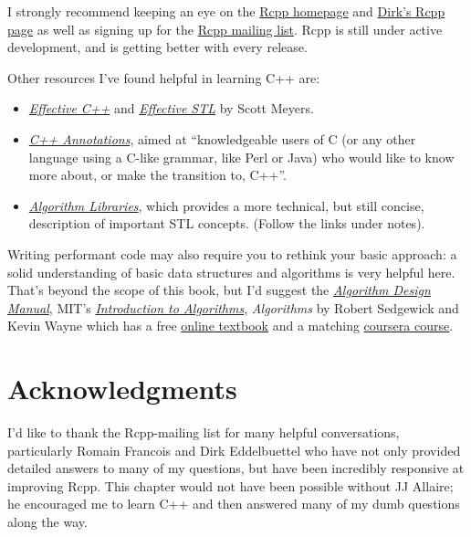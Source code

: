 I strongly recommend keeping an eye on the
\href{http://www.rcpp.org}{Rcpp homepage} and
\href{http://dirk.eddelbuettel.com/code/rcpp.html}{Dirk's Rcpp page} as
well as signing up for the
\href{http://lists.r-forge.r-project.org/cgi-bin/mailman/listinfo/rcpp-devel}{Rcpp
mailing list}. Rcpp is still under active development, and is getting
better with every release.

Other resources I've found helpful in learning C++ are:

\begin{itemize}
\item
  \href{http://amzn.com/0321334876?tag=devtools-20}{\emph{Effective
  C++}} and
  \href{http://amzn.com/0201749629?tag=devtools-20}{\emph{Effective
  STL}} by Scott Meyers.
\item
  \href{http://www.icce.rug.nl/documents/cplusplus/cplusplus.html}{\emph{C++
  Annotations}}, aimed at ``knowledgeable users of C (or any other
  language using a C-like grammar, like Perl or Java) who would like to
  know more about, or make the transition to, C++''.
\item
  \href{http://www.cs.helsinki.fi/u/tpkarkka/alglib/k06/}{\emph{Algorithm
  Libraries}}, which provides a more technical, but still concise,
  description of important STL concepts. (Follow the links under notes).
\end{itemize}

Writing performant code may also require you to rethink your basic
approach: a solid understanding of basic data structures and algorithms
is very helpful here. That's beyond the scope of this book, but I'd
suggest the
\href{http://amzn.com/0387948600?tag=devtools-20}{\emph{Algorithm Design
Manual}}, MIT's
\href{http://ocw.mit.edu/courses/electrical-engineering-and-computer-science/6-046j-introduction-to-algorithms-sma-5503-fall-2005/}{\emph{Introduction
to Algorithms}}, \emph{Algorithms} by Robert Sedgewick and Kevin Wayne
which has a free \href{http://algs4.cs.princeton.edu/home/}{online
textbook} and a matching
\href{https://www.coursera.org/course/algs4partI}{coursera course}.

\section{Acknowledgments}

I'd like to thank the Rcpp-mailing list for many helpful conversations,
particularly Romain Francois and Dirk Eddelbuettel who have not only
provided detailed answers to many of my questions, but have been
incredibly responsive at improving Rcpp. This chapter would not have
been possible without JJ Allaire; he encouraged me to learn C++ and then
answered many of my dumb questions along the way.
